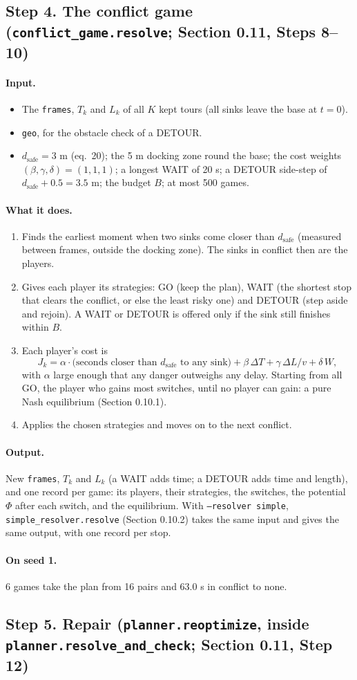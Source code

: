 \documentclass[10pt]{article}
\newcommand{\code}[1]{\texttt{#1}}
\newcommand{\dsafe}{d_{\mathrm{safe}}}
\newcommand{\inputs}{\paragraph{Input.}}
\newcommand{\does}{\paragraph{What it does.}}
\newcommand{\outputs}{\paragraph{Output.}}
\newcommand{\seedone}{\paragraph{On seed 1.}}
\begin{document}
\subsection*{Step 4. The conflict game (\code{conflict\_game.resolve}; Section 0.11, Steps 8--10)}

\inputs
\begin{itemize}
  \item The \code{frames}, $T_k$ and $L_k$ of all $K$ kept tours (all sinks leave the base at $t = 0$).
  \item \code{geo}, for the obstacle check of a DETOUR.
  \item $\dsafe = 3$ m (eq.~20); the 5 m docking zone round the base; the cost weights $(\beta, \gamma, \delta) =
    (1, 1, 1)$; a longest WAIT of 20 s; a DETOUR side-step of $\dsafe + 0.5 = 3.5$ m; the budget $B$; at most 500
    games.
\end{itemize}
\does
\begin{enumerate}
  \item Finds the earliest moment when two sinks come closer than $\dsafe$ (measured between frames, outside the
    docking zone). The sinks in conflict then are the players.
  \item Gives each player its strategies: GO (keep the plan), WAIT (the shortest stop that clears the conflict, or else the
    least risky one) and DETOUR (step aside and rejoin). A WAIT or DETOUR is offered only if the sink still finishes within $B$.
  \item Each player's cost is
    \[ J_k = \alpha \cdot \text{(seconds closer than $\dsafe$ to any sink)} + \beta\,\Delta T + \gamma\,\Delta L / v +
       \delta\,W, \]
    with $\alpha$ large enough that any danger outweighs any delay. Starting from all GO, the player who gains most
    switches, until no player can gain: a pure Nash equilibrium (Section 0.10.1).
  \item Applies the chosen strategies and moves on to the next conflict.
\end{enumerate}
\outputs New \code{frames}, $T_k$ and $L_k$ (a WAIT adds time; a DETOUR adds time and length), and one record per game:
its players, their strategies, the switches, the potential $\Phi$ after each switch, and the equilibrium. With
\code{--resolver simple}, \code{simple\_resolver.resolve} (Section 0.10.2) takes the same input and gives the same output,
with one record per stop.
\seedone 6 games take the plan from 16 pairs and 63.0 s in conflict to none.

\subsection*{Step 5. Repair (\code{planner.reoptimize}, inside \code{planner.resolve\_and\_check}; Section 0.11,
Step 12)}
\end{document}
